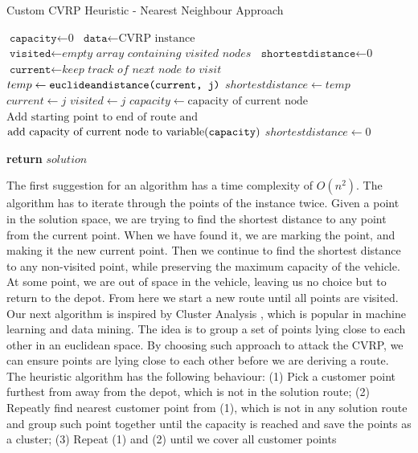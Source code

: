 \documentclass[12pt]{article}
\newcommand{\var}{\texttt}
\begin{document}
\begin{algorithm}[!ht]
	\caption{Custom CVRP Heuristic - Nearest Neighbour Approach}\label{euclid}
	\begin{algorithmic}[1]
	\State $\var{capacity} \gets \text{0}$
	\State $\var{data} \gets \text{CVRP instance}$
	\State $\var{visited} \gets \textit{empty array containing visited nodes}$
	\State $\var{shortestdistance} \gets \textit{0}$
	\State $\var{current} \gets \textit{keep track of next node to visit}$
	\For{\texttt{$\var{i} \gets 0$ to $\text{length of data-1}$}}
		\For{\texttt{$\var{j} \gets 1$ to $\text{length of data}$}}
			\State $temp \gets \var{euclideandistance(\var{current}, \var{j})}$
					\State $shortestdistance \gets temp$
					\State $current \gets j$
					\State $visited \gets j$
					\newline{}
						\State $capacity \gets \text{capacity of current node}$					
					\Else
						\State $\text{Add starting point to end of route and}$
						\State $\text{add capacity of current node to variable(\var{capacity})}$
					\EndIf
				\EndIf
			\EndIf
		\EndFor
		\State $shortestdistance \gets 0$ 
	\EndFor

	\State \textbf{return} $solution$
	\EndFunction
	\end{algorithmic}
\end{algorithm}

The first suggestion for an algorithm has a time complexity of $O(n^2)$. The algorithm has to iterate through the points of the instance twice. 
Given a point in the solution space, we are trying to find the shortest distance to any point from the current point. When we have found it, we are marking the point,
and making it the new current point. Then we continue to find the shortest distance to any non-visited point, while preserving the maximum capacity of the vehicle. 
At some point, we are out of space in the vehicle, leaving us no choice but to return to the depot. From here we start a new route until all points are visited.
\newline
Our next algorithm is inspired by Cluster Analysis \cite{website:cluster-analysis}, which is popular in machine learning and data mining. 
The idea is to group a set of points lying close to each other in an euclidean space. 
By choosing such approach to attack the CVRP, we can ensure points are lying close to each other before we are deriving a route.
\newline
The heuristic algorithm has the following behaviour: (1) Pick a customer point furthest from away from the depot, which is not in the solution route;
(2) Repeatly find nearest customer point from (1), which is not in any solution route and group such point together until the capacity is reached and save the points as a cluster; (3) Repeat (1) and (2) until we cover all customer points
\end{document}

